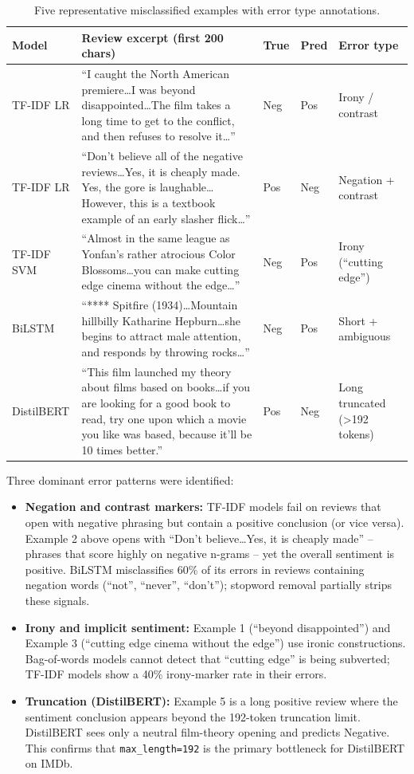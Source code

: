 \documentclass[11pt,a4paper]{article}
\begin{document}
\begin{table}[H]
\centering
\caption{Five representative misclassified examples with error type annotations.}
\label{tab:q1misclass}
\small
\begin{tabular}{p{0.9cm}p{7.5cm}p{1.1cm}p{1.1cm}p{1.5cm}}
\toprule
Model & Review excerpt (first 200 chars) & True & Pred & Error type \\
\midrule
TF-IDF LR &
``I caught the North American premiere\ldots I was beyond disappointed\ldots The film takes a long time to get to the conflict, and then refuses to resolve it\ldots'' &
Neg & Pos & Irony / contrast \\
\midrule
TF-IDF LR &
``Don't believe all of the negative reviews\ldots Yes, it is cheaply made. Yes, the gore is laughable\ldots However, this is a textbook example of an early slasher flick\ldots'' &
Pos & Neg & Negation + contrast \\
\midrule
TF-IDF SVM &
``Almost in the same league as Yonfan's rather atrocious Color Blossoms\ldots you can make cutting edge cinema without the edge\ldots'' &
Neg & Pos & Irony (``cutting edge'') \\
\midrule
BiLSTM &
``**** Spitfire (1934)\ldots Mountain hillbilly Katharine Hepburn\ldots she begins to attract male attention, and responds by throwing rocks\ldots'' &
Neg & Pos & Short + ambiguous \\
\midrule
DistilBERT &
``This film launched my theory about films based on books\ldots if you are looking for a good book to read, try one upon which a movie you like was based, because it'll be 10 times better.'' &
Pos & Neg & Long truncated (>192 tokens) \\
\bottomrule
\end{tabular}
\end{table}

Three dominant error patterns were identified:

\begin{itemize}
    \item \textbf{Negation and contrast markers:} TF-IDF models fail on reviews that open with negative phrasing but contain a positive conclusion (or vice versa). Example 2 above opens with ``Don't believe\ldots Yes, it is cheaply made'' -- phrases that score highly on negative n-grams -- yet the overall sentiment is positive. BiLSTM misclassifies 60\% of its errors in reviews containing negation words (``not'', ``never'', ``don't''); stopword removal partially strips these signals.
    \item \textbf{Irony and implicit sentiment:} Example 1 (``beyond disappointed'') and Example 3 (``cutting edge cinema without the edge'') use ironic constructions. Bag-of-words models cannot detect that ``cutting edge'' is being subverted; TF-IDF models show a 40\% irony-marker rate in their errors.
    \item \textbf{Truncation (DistilBERT):} Example 5 is a long positive review where the sentiment conclusion appears beyond the 192-token truncation limit. DistilBERT sees only a neutral film-theory opening and predicts Negative. This confirms that \texttt{max\_length=192} is the primary bottleneck for DistilBERT on IMDb.
\end{itemize}
\end{document}
